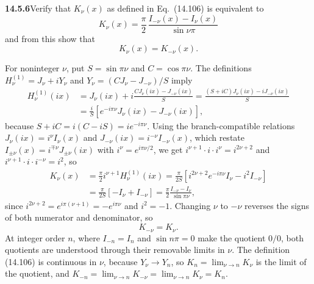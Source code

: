 \par\bigskip
\noindent\textbf{14.5.6}\quad Verify that $K_{\nu}(x)$ as defined in
Eq.~(14.106) is equivalent to
\[
K_{\nu}(x)=\frac{\pi}{2}\,\frac{I_{-\nu}(x)-I_{\nu}(x)}{\sin\nu\pi}
\]
and from this show that
\[
K_{\nu}(x)=K_{-\nu}(x).
\]
\par{}
\solution
For noninteger $\nu$, put $S=\sin\pi\nu$ and
$C=\cos\pi\nu$. The definitions $H_\nu^{(1)}=J_\nu+iY_\nu$ and
$Y_\nu=(CJ_\nu-J_{-\nu})/S$ imply
\begin{align*}
H_\nu^{(1)}(ix)
&=J_\nu(ix)+i\frac{CJ_\nu(ix)-J_{-\nu}(ix)}S
=\frac{(S+iC)J_\nu(ix)-iJ_{-\nu}(ix)}S\\
&=\frac{i}{S}[e^{-i\pi\nu}J_\nu(ix)-J_{-\nu}(ix)],
\end{align*}
because $S+iC=i(C-iS)=i e^{-i\pi\nu}$. Using the
branch-compatible relations $J_\nu(ix)=i^\nu I_\nu(x)$ and
$J_{-\nu}(ix)=i^{-\nu}I_{-\nu}(x)$, which restate
$I_{\pm\nu}(x)=i^{\mp\nu}J_{\pm\nu}(ix)$ with $i^\nu=e^{i\pi\nu/2}$,
we get $i^{\nu+1}\cdot i\cdot i^\nu=i^{2\nu+2}$ and
$i^{\nu+1}\cdot i\cdot i^{-\nu}=i^2$, so
\begin{align*}
K_\nu(x)&=\frac\pi2i^{\nu+1}H_\nu^{(1)}(ix)
=\frac\pi{2S}
\left[i^{2\nu+2}e^{-i\pi\nu}I_\nu-i^2I_{-\nu}\right]\\
&=\frac\pi{2S}\left[-I_\nu+I_{-\nu}\right]
=\boxed{\frac\pi2\frac{I_{-\nu}-I_\nu}{\sin\pi\nu}},
\end{align*}
since $i^{2\nu+2}=e^{i\pi(\nu+1)}=-e^{i\pi\nu}$ and $i^2=-1$.
Changing $\nu$ to $-\nu$ reverses the signs of both numerator
and denominator, so
\[
\boxed{K_{-\nu}=K_\nu}.
\]
At integer order $n$, where $I_{-n}=I_n$ and $\sin n\pi=0$ make the
quotient $0/0$, both quotients are understood through their
removable limits in $\nu$. The definition (14.106) is continuous
in $\nu$, because $Y_\nu\to Y_n$, so $K_n=\lim_{\nu\to n}K_\nu$ is the
limit of the quotient, and
$K_{-n}=\lim_{\nu\to n}K_{-\nu}=\lim_{\nu\to n}K_\nu=K_n$.

